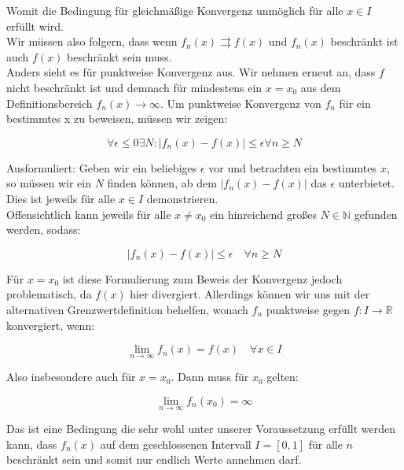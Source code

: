 \documentclass[a4paper,german,12pt,smallheadings]{scrartcl}
\begin{document}
Womit die Bedingung für gleichmäßige Konvergenz unmöglich für alle $x \in I$ erfüllt wird.\\

Wir müssen also folgern, dass wenn $f_n(x) \rightrightarrows f(x)$ und $f_n(x)$ beschränkt ist auch $f(x)$ beschränkt sein muss.\\

Anders sieht es für punktweise Konvergenz aus. Wir nehmen erneut an, dass $f$ nicht beschränkt ist und demnach für mindestens ein $x=x_0$ aus dem Definitionsbereich $f_n(x) \rightarrow \infty$. 
Um punktweise Konvergenz von $f_n$ für ein bestimmtes x zu beweisen, müssen wir zeigen:

\begin{equation*}
\forall \epsilon \le 0 \exists N: |f_n(x)-f(x)| \le \epsilon \forall n \geq N
\end{equation*}

Ausformuliert: Geben wir ein beliebiges $\epsilon$ vor und betrachten ein bestimmtes $x$, so müssen wir ein $N$ finden können, ab dem $|f_n(x)-f(x)|$ das $\epsilon$ unterbietet. Dies ist jeweils für alle $x \in I$ demonstrieren.\\

Offensichtlich kann jeweils für alle $x \neq x_0$ ein hinreichend großes $N \in \mathbb{N}$ gefunden werden, sodass:

\begin{equation*}
|f_n(x)-f(x)| \le \epsilon \quad \forall n \ge N
\end{equation*}

Für $x=x_0$ ist diese Formulierung zum Beweis der Konvergenz jedoch problematisch, da $f(x)$ hier divergiert. Allerdings können wir uns mit der alternativen Grenzwertdefinition behelfen, wonach $f_n$ punktweise gegen $f:I \rightarrow \mathbb{R}$ konvergiert, wenn:

\begin{equation*}
\lim\limits_{n \to \infty}f_n(x)=f(x) \quad \forall x \in I
\end{equation*} 

Also insbesondere auch für $x=x_0$. Dann muss für $x_0$ gelten:

\begin{equation*}
\lim\limits_{n \to \infty}f_n(x_0) = \infty
\end{equation*}

Das ist eine Bedingung die sehr wohl unter unserer Voraussetzung erfüllt werden kann, dass $f_n(x)$ auf dem geschlossenen Intervall $I=[0,1]$ für alle $n$ beschränkt sein und somit nur endlich Werte annehmen darf.\\
\end{document}
